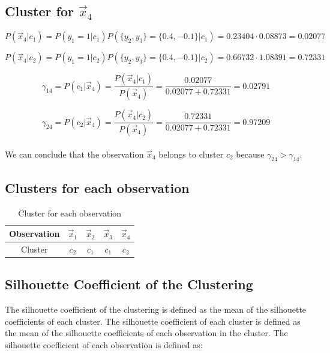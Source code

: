 \documentclass{article}
\begin{document}
\subsection*{Cluster for $\vec{x}_4$}

\[ P(\vec{x}_4 | c_1) = P(y_1 = 1 | c_1) P(\{y_2, y_3\}  = \{0.4, -0.1\} | c_1) = 0.23404 \cdot 0.08873  = 0.02077 \]

\[ P(\vec{x}_4 | c_2) = P(y_1 = 1 | c_2) P(\{y_2, y_3\}  = \{0.4, -0.1\} | c_2) = 0.66732 \cdot 1.08391  = 0.72331 \]

\[ \gamma_{14} = P(c_1| \vec{x}_4) = \frac{P(\vec{x}_4 | c_1)}{P(\vec{x}_4)} = \frac{0.02077}{0.02077 + 0.72331} = 0.02791 \]

\[ \gamma_{24} = P(c_2| \vec{x}_4) = \frac{P(\vec{x}_4 | c_2)}{P(\vec{x}_4)} = \frac{0.72331}{0.02077 + 0.72331} = 0.97209 \]

\paragraph{} We can conclude that the observation $\vec{x}_4$ belongs to cluster $c_2$ because $\gamma_{24} > \gamma_{14}$.

\subsection*{Clusters for each observation}

\begin{table}[h!]
  \centering
  \begin{tabular}{c|c|c|c|c}
    Observation & $\vec{x}_1$ & $\vec{x}_2$ & $\vec{x}_3$ & $\vec{x}_4$ \\ \hline
    Cluster & $c_2$ & $c_1$ & $c_1$ & $c_2$ \\ 
  \end{tabular}
  \caption{Cluster for each observation}
  \label{tab:clusters}
\end{table}

\subsection*{Silhouette Coefficient of the Clustering}

The silhouette coefficient of the clustering is defined as the mean of the silhouette coefficients of each cluster. The silhouette coefficient of each cluster is defined as the mean of the silhouette coefficients of each observation in the cluster. The silhouette coefficient of each observation is defined as:
\end{document}
